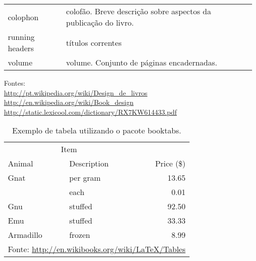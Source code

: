 \begin{table}
\begin{tabular}{p{4cm}p{4cm}}
		colophon & colofão. Breve descrição sobre aspectos da publicação do livro. \\
		
		running headers & títulos correntes\\
		
		volume & volume. Conjunto de páginas encadernadas.\\
		
		\bottomrule
	\end{tabular}
	\footnotesize Fontes:\\
	\url{http://pt.wikipedia.org/wiki/Design_de_livros}\\
	\url{http://en.wikipedia.org/wiki/Book_design}\\
	\url{http://static.lexicool.com/dictionary/RX7KW614433.pdf}\\
\end{table}


\begin{table}
	\caption{Exemplo de tabela utilizando o pacote \textsf{booktabs}.}
	\label{booktabs}
	\centering
	\begin{tabular}{llr}
		\toprule
		\multicolumn{2}{c}{Item} \\
		\cmidrule(r){1-2}
		Animal    & Description & Price (\$) \\
		\midrule
		Gnat      & per gram    & 13.65      \\
		& each        & 0.01       \\
		Gnu       & stuffed     & 92.50      \\
		Emu       & stuffed     & 33.33      \\
		Armadillo & frozen      & 8.99       \\
		\bottomrule
		\multicolumn{3}{l}{\ABNTEXfontereduzida Fonte: \url{http://en.wikibooks.org/wiki/LaTeX/Tables}}
	\end{tabular}
\end{table}